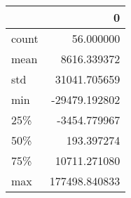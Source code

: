 \begin{tabular}{lr}
\toprule
{} &              0 \\
\midrule
count &      56.000000 \\
mean  &    8616.339372 \\
std   &   31041.705659 \\
min   &  -29479.192802 \\
25\%   &   -3454.779967 \\
50\%   &     193.397274 \\
75\%   &   10711.271080 \\
max   &  177498.840833 \\
\bottomrule
\end{tabular}
